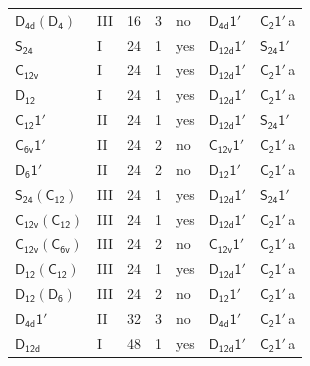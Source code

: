 \documentclass[10pt,a4paper]{article}
\numberwithin{equation}{section}
\newcommand{\grp}[1]{\mathsf{#1}}
\newcommand{\clsletter}[1]{\,{\scriptsize\color{black!55}#1}}
\begin{document}
{\begin{longtable}{@{}llrrlll@{}}
\href{D4d-D4.pdf}{$\grp{D_{4d}}(\grp{D_{4}})$} & III & 16 & 3 & no & \href{D4d-1p.pdf}{$\grp{D_{4d}1'}$} & \href{C2-1p.pdf}{$\grp{C_{2}1'}$}\clsletter{a}\\
\href{../../../rotation/data/pdf/S24.pdf}{$\grp{S_{24}}$} & I & 24 & 1 & yes & \href{D12d-1p.pdf}{$\grp{D_{12d}1'}$} & \href{S24-1p.pdf}{$\grp{S_{24}1'}$}\\
\href{../../../rotation/data/pdf/C12v.pdf}{$\grp{C_{12v}}$} & I & 24 & 1 & yes & \href{D12d-1p.pdf}{$\grp{D_{12d}1'}$} & \href{C2-1p.pdf}{$\grp{C_{2}1'}$}\clsletter{a}\\
\href{../../../rotation/data/pdf/D12.pdf}{$\grp{D_{12}}$} & I & 24 & 1 & yes & \href{D12d-1p.pdf}{$\grp{D_{12d}1'}$} & \href{C2-1p.pdf}{$\grp{C_{2}1'}$}\clsletter{a}\\
\href{C12-1p.pdf}{$\grp{C_{12}1'}$} & II & 24 & 1 & yes & \href{D12d-1p.pdf}{$\grp{D_{12d}1'}$} & \href{S24-1p.pdf}{$\grp{S_{24}1'}$}\\
\href{C6v-1p.pdf}{$\grp{C_{6v}1'}$} & II & 24 & 2 & no & \href{C12v-1p.pdf}{$\grp{C_{12v}1'}$} & \href{C2-1p.pdf}{$\grp{C_{2}1'}$}\clsletter{a}\\
\href{D6-1p.pdf}{$\grp{D_{6}1'}$} & II & 24 & 2 & no & \href{D12-1p.pdf}{$\grp{D_{12}1'}$} & \href{C2-1p.pdf}{$\grp{C_{2}1'}$}\clsletter{a}\\
\href{S24-C12.pdf}{$\grp{S_{24}}(\grp{C_{12}})$} & III & 24 & 1 & yes & \href{D12d-1p.pdf}{$\grp{D_{12d}1'}$} & \href{S24-1p.pdf}{$\grp{S_{24}1'}$}\\
\href{C12v-C12.pdf}{$\grp{C_{12v}}(\grp{C_{12}})$} & III & 24 & 1 & yes & \href{D12d-1p.pdf}{$\grp{D_{12d}1'}$} & \href{C2-1p.pdf}{$\grp{C_{2}1'}$}\clsletter{a}\\
\href{C12v-C6v.pdf}{$\grp{C_{12v}}(\grp{C_{6v}})$} & III & 24 & 2 & no & \href{C12v-1p.pdf}{$\grp{C_{12v}1'}$} & \href{C2-1p.pdf}{$\grp{C_{2}1'}$}\clsletter{a}\\
\href{D12-C12.pdf}{$\grp{D_{12}}(\grp{C_{12}})$} & III & 24 & 1 & yes & \href{D12d-1p.pdf}{$\grp{D_{12d}1'}$} & \href{C2-1p.pdf}{$\grp{C_{2}1'}$}\clsletter{a}\\
\href{D12-D6.pdf}{$\grp{D_{12}}(\grp{D_{6}})$} & III & 24 & 2 & no & \href{D12-1p.pdf}{$\grp{D_{12}1'}$} & \href{C2-1p.pdf}{$\grp{C_{2}1'}$}\clsletter{a}\\
\href{D4d-1p.pdf}{$\grp{D_{4d}1'}$} & II & 32 & 3 & no & \href{D4d-1p.pdf}{$\grp{D_{4d}1'}$} & \href{C2-1p.pdf}{$\grp{C_{2}1'}$}\clsletter{a}\\
\href{../../../rotation/data/pdf/D12d.pdf}{$\grp{D_{12d}}$} & I & 48 & 1 & yes & \href{D12d-1p.pdf}{$\grp{D_{12d}1'}$} & \href{C2-1p.pdf}{$\grp{C_{2}1'}$}\clsletter{a}\\

\end{longtable}}
\end{document}
